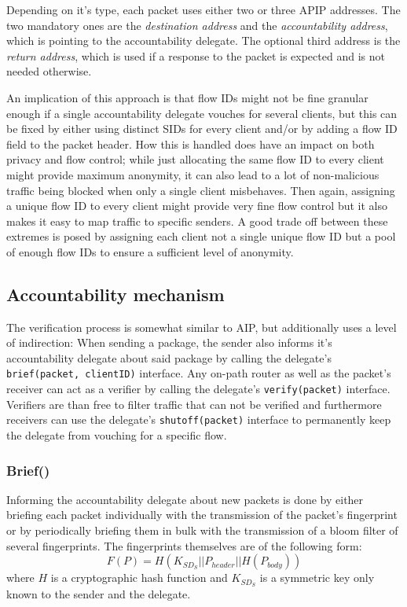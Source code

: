 \documentclass{acm_proc_article-sp}
\begin{document}
Depending on it's type, each packet uses either two or three APIP addresses. The two mandatory ones are the \emph{destination address} and the \emph{accountability address}, which is pointing to the accountability delegate. The optional third address is the \emph{return address}, which is used if a response to the packet is expected and is not needed otherwise.

An implication of this approach is that flow IDs might not be fine granular enough if a single accountability delegate vouches for several clients, but this can be fixed by either using distinct SIDs for every client and/or by adding a flow ID field to the packet header. How this is handled does have an impact on both privacy and flow control; while just allocating the same flow ID to every client might provide maximum anonymity, it can also lead to a lot of non-malicious traffic being blocked when only a single client misbehaves. Then again, assigning a unique flow ID to every client might provide very fine flow control but it also makes it easy to map traffic to specific senders. A good trade off between these extremes is posed by assigning each client not a single unique flow ID but a pool of enough flow IDs to ensure a sufficient level of anonymity. 

\subsection{Accountability mechanism}

The verification process is somewhat similar to AIP, but additionally uses a level of indirection: When sending a package, the sender also informs it's accountability delegate about said package by calling the delegate's \texttt{brief(packet, clientID)} interface. Any on-path router as well as the packet's receiver can act as a verifier by calling the delegate's \texttt{verify(packet)} interface. Verifiers are than free to filter traffic that can not be verified and furthermore receivers can use the delegate's \texttt{shutoff(packet)} interface to permanently keep the delegate from vouching for a specific flow.

\subsubsection{Brief()}
Informing the accountability delegate about new packets is done by either briefing each packet individually with the transmission of the packet's fingerprint or by periodically briefing them in bulk with the transmission of a bloom filter of several fingerprints. The fingerprints themselves are of the following form:
\begin{equation}
F(P) = H(K_{SD_S} || P_{header} || H(P_{body} ))
\end{equation}
where $H$ is a cryptographic hash function and $K_{SD_S}$ is a symmetric key only known to the sender and the delegate.
\end{document}
